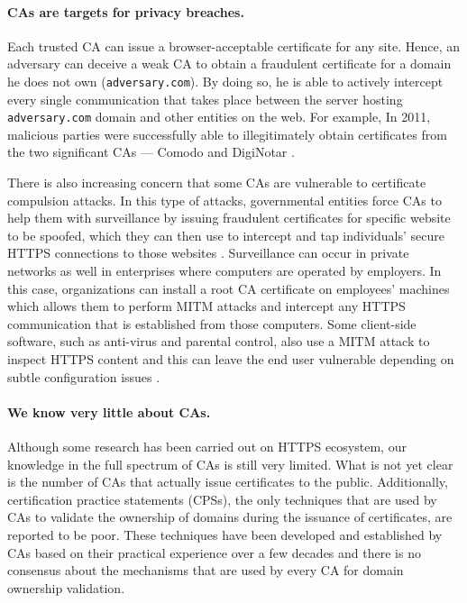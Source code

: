 
\paragraph{CAs are targets for privacy breaches.} Each trusted CA can issue a browser-acceptable certificate for any site. Hence, an adversary can deceive a weak CA to obtain a fraudulent certificate for a domain he does not own (\ie \texttt{adversary.com}). By doing so, he is able to actively intercept every single communication that takes place between the server hosting \texttt{adversary.com} domain and other entities on the web. For example, In 2011, malicious parties were successfully able to illegitimately obtain certificates from the two significant CAs --- Comodo \cite{eckersley2010observatory}\cite{ComodoRe52:online} and DigiNotar \cite{kaminskypki}.

There is also increasing concern that some CAs are vulnerable to certificate compulsion attacks. In this type of attacks, governmental entities force CAs to help them with surveillance by issuing fraudulent certificates for specific website to be spoofed, which they can then use to intercept and tap individuals' secure HTTPS connections to those websites \cite{soghoian2011certified}. Surveillance can occur in private networks as well \eg in enterprises where computers are operated by employers. In this case, organizations can install a root CA certificate on employees' machines which allows them to perform MITM attacks and intercept any HTTPS communication that is established from those computers. Some client-side software, such as anti-virus and parental control, also use a MITM attack to inspect HTTPS content and this can leave the end user vulnerable depending on subtle configuration issues \cite{de2016killed}. 

\paragraph{We know very little about CAs.} Although some research has been carried out on HTTPS ecosystem, our knowledge in the full spectrum of CAs is still very limited. What is not yet clear is the number of CAs that actually issue certificates to the public. Additionally, certification practice statements (CPSs), the only techniques that are used by CAs to validate the ownership of domains during the issuance of certificates, are reported to be poor. These techniques have been developed and established by CAs based on their practical experience over a few decades and there is no consensus about the mechanisms that are used by every CA for domain ownership validation.

